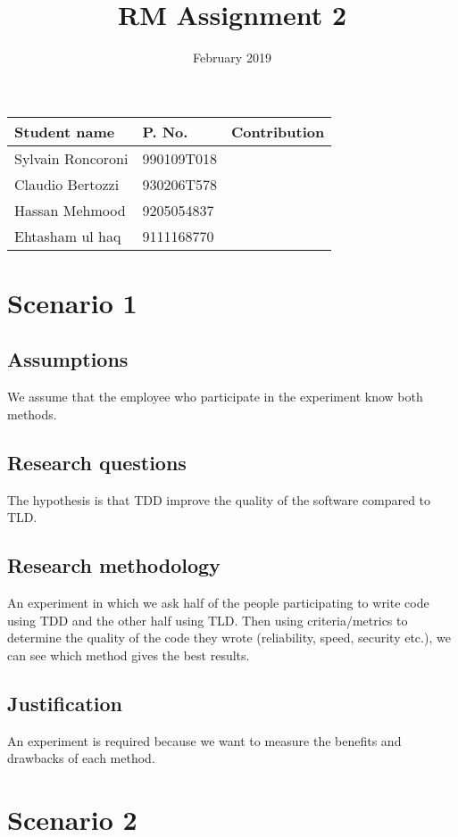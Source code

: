 \documentclass{article}
\title{RM Assignment 2}
\date{February 2019}
\begin{document}
\maketitle

\begin{tabular}{|l|l|l|}
\hline
     \textbf{Student name} & \textbf{P. No.} & \textbf{Contribution} \\
     \hline
     Sylvain Roncoroni & 990109T018 & \\
     Claudio Bertozzi & 930206T578 & \\
     Hassan Mehmood & 9205054837 & \\
     Ehtasham ul haq & 9111168770\\
     \hline
\end{tabular}

\section{Scenario 1}
\subsection{Assumptions}
We assume that the employee who participate in the experiment know both methods.

\subsection{Research questions}
The hypothesis is that TDD improve the quality of the software compared to TLD.

\subsection{Research methodology}
An experiment in which we ask half of the people participating to write code using TDD and the other half using TLD. Then using criteria/metrics to determine the quality of the code they wrote (reliability, speed, security etc.), we can see which method gives the best results.

\subsection{Justification}
An experiment is required because we want to measure the benefits and drawbacks of each method.

\section{Scenario 2}
\end{document}
